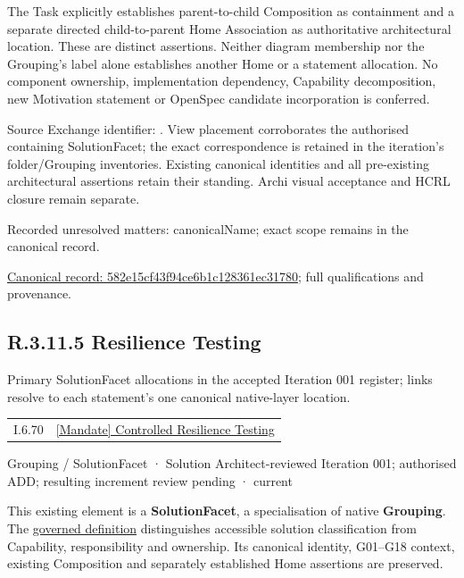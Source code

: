 The Task explicitly establishes parent-to-child Composition as containment and
a separate directed child-to-parent Home Association as authoritative architectural
location. These are distinct assertions. Neither diagram membership nor the
Grouping's label alone establishes another Home or a statement allocation.
No component ownership, implementation dependency, Capability decomposition,
new Motivation statement or OpenSpec candidate incorporation is conferred.



Source Exchange identifier: \texttt{}. View placement corroborates
the authorised containing SolutionFacet; the exact correspondence is retained in the
iteration's folder/Grouping inventories. Existing canonical identities and all
pre-existing architectural assertions retain their standing. Archi visual
acceptance and HCRL closure remain separate.


{\small Recorded unresolved matters: canonicalName; exact scope remains in the canonical record.}\par
{\footnotesize \href{../../../../../../../continuum/grouping/582e15cf43f94ce6b1c128361ec31780.md}{Canonical record: 582e15cf43f94ce6b1c128361ec31780}; full qualifications and provenance.}\par
\subsection*{R.3.11.5 Resilience Testing}
\label{navigation:R.3.11.5}

Primary SolutionFacet allocations in the accepted Iteration 001 register; links resolve to each statement’s one canonical native-layer location.\par
\begin{longtable}{p{.22\linewidth}p{.73\linewidth}}
I.6.70 & \hyperref[element:f2d38e7beef84b61a769de4ca7f48951]{[Mandate] Controlled Resilience Testing} \\
\end{longtable}
\label{element:d3fb5abc58af4347ab52cdc26e9b14f1}
{\small Grouping / SolutionFacet · Solution Architect-reviewed Iteration 001; authorised ADD; resulting increment review pending · current}\par

This existing element is a \textbf{SolutionFacet}, a specialisation of native
\textbf{Grouping}. The \href{\detokenize{../../../../../../../governance/continuum-representation.md#solutionfacet-classification--1119-candidate}}{governed definition}
distinguishes accessible solution classification from Capability, responsibility
and ownership. Its canonical identity, G01–G18 context, existing Composition
and separately established Home assertions are preserved.



